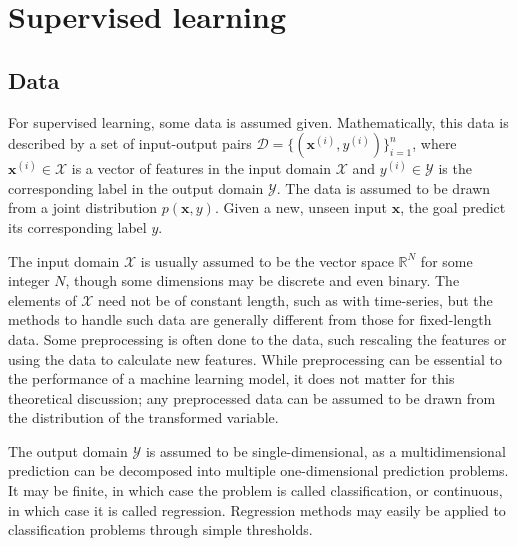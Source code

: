 \section{Supervised learning}
\label{sec:supervised_learning}

\subsection{Data}
For supervised learning, some data is assumed given.
Mathematically, this data is described by a set of input-output pairs $\mathcal{D} = \{(\bm{x}^{(i)}, y^{(i)})\}_{i=1}^n$, where $\bm{x}^{(i)} \in\mathcal{X}$ is a vector of features in the input domain $\mathcal{X}$ and $y^{(i)}\in\mathcal{Y}$ is the corresponding label in the output domain $\mathcal{Y}$.
The data is assumed to be drawn from a joint distribution $p(\bm{x}, y)$.
Given a new, unseen input $\bm{x}$, the goal predict its corresponding label $y$.

The input domain $\mathcal{X}$ is usually assumed to be the vector space $\mathbb{R}^N$ for some integer $N$, though some dimensions may be discrete and even binary.
The elements of $\mathcal{X}$ need not be of constant length, such as with time-series, but the methods to handle such data are generally different from those for fixed-length data.
Some preprocessing is often done to the data, such rescaling the features or using the data to calculate new features.
While preprocessing can be essential to the performance of a machine learning model, it does not matter for this theoretical discussion; any preprocessed data can be assumed to be drawn from the distribution of the transformed variable.

The output domain $\mathcal{Y}$ is assumed to be single-dimensional, as a multidimensional prediction can be decomposed into multiple one-dimensional prediction problems.
It may be finite, in which case the problem is called classification, or continuous, in which case it is called regression.
Regression methods may easily be applied to classification problems through simple thresholds.

